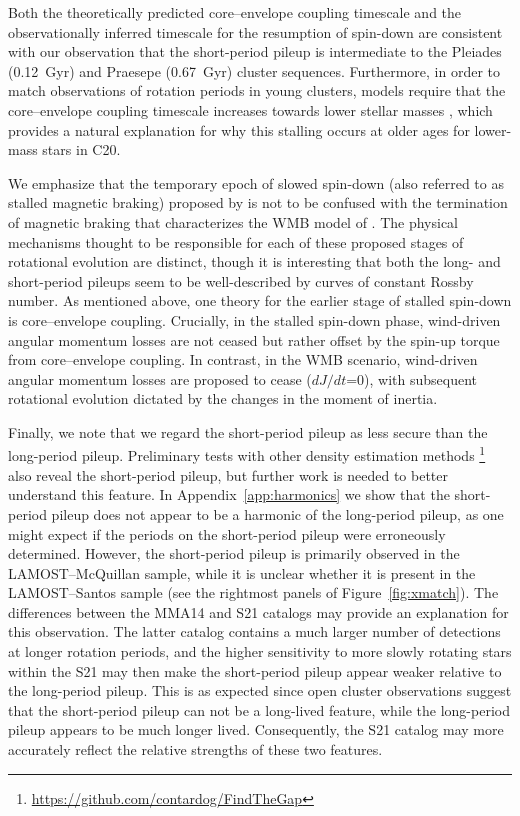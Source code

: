 \documentclass[trackchanges,twocolumn]{aastex631}
\newcommand{\lamostmcq}{LAMOST--McQuillan\xspace}
\newcommand{\lamostsan}{LAMOST--Santos\xspace}
\newcommand{\mma}{MMA14\xspace}
\newcommand{\curtis}{C20\xspace}
\newcommand{\santos}{S21\xspace}
\begin{document}
Both the theoretically predicted core–envelope coupling timescale and the observationally inferred timescale for the resumption of spin-down are consistent with our observation that the short-period pileup is intermediate to the Pleiades (0.12~Gyr) and Praesepe (0.67~Gyr) cluster sequences. Furthermore, in order to match observations of rotation periods in young clusters, models require that the core–envelope coupling timescale increases towards lower stellar masses \citep[e.g.][]{Irwin2007, Denissenkov2010, GalletBouvier2015}, which provides a natural explanation for why this stalling occurs at older ages for lower-mass stars in \curtis. 

We emphasize that the temporary epoch of slowed spin-down (also referred to as stalled magnetic braking) proposed by \citet{Curtis2019a, Curtis2020} is not to be confused with the termination of magnetic braking that characterizes the WMB model of \citet{vanSaders2016, vanSaders2019}. The physical mechanisms thought to be responsible for each of these proposed stages of rotational evolution are distinct, though it is interesting that both the long- and short-period pileups seem to be well-described by curves of constant Rossby number. As mentioned above, one theory for the earlier stage of stalled spin-down is core–envelope coupling. Crucially, in the stalled spin-down phase, wind-driven angular momentum losses are not ceased but rather offset by the spin-up torque from core–envelope coupling. In contrast, in the WMB scenario, wind-driven angular momentum losses are proposed to cease ($dJ/dt$=0), with subsequent rotational evolution dictated by the changes in the moment of inertia. 

Finally, we note that we regard the short-period pileup as less secure than the long-period pileup. Preliminary tests with other density estimation methods \citep{Contardo2022}\footnote{\url{https://github.com/contardog/FindTheGap}} also reveal the short-period pileup, but further work is needed to better understand this feature. In Appendix~\ref{app:harmonics} we show that the short-period pileup does not appear to be a harmonic of the long-period pileup, as one might expect if the periods on the short-period pileup were erroneously determined. However, the short-period pileup is primarily observed in the \lamostmcq sample, while it is unclear whether it is present in the \lamostsan sample (see the rightmost panels of Figure~\ref{fig:xmatch}). The differences between the \mma and \santos catalogs may provide an explanation for this observation. The latter catalog contains a much larger number of detections at longer rotation periods, and the higher sensitivity to more slowly rotating stars within the \santos may then make the short-period pileup appear weaker relative to the long-period pileup. This is as expected since open cluster observations suggest that the short-period pileup can not be a long-lived feature, while the long-period pileup appears to be much longer lived. Consequently, the \santos catalog may more accurately reflect the relative strengths of these two features.
\end{document}

